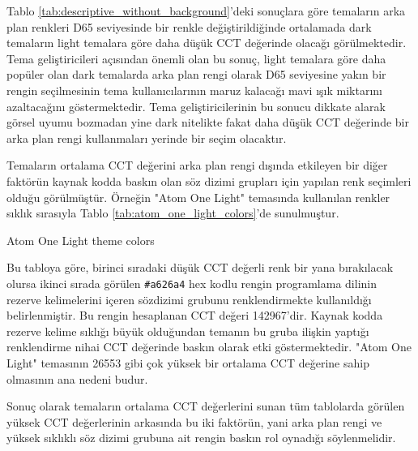 \documentclass{article}
\begin{document}
Tablo \ref{tab:descriptive_without_background}'deki sonuçlara göre temaların arka plan renkleri D65 seviyesinde bir
renkle değiştirildiğinde ortalamada dark temaların light temalara göre daha düşük CCT değerinde olacağı görülmektedir.
Tema geliştiricileri açısından önemli olan bu sonuç, light temalara göre daha popüler olan dark temalarda arka plan
rengi olarak D65 seviyesine yakın bir rengin seçilmesinin tema kullanıcılarının maruz kalacağı mavi ışık miktarını
azaltacağını göstermektedir.  Tema geliştiricilerinin bu sonucu dikkate alarak görsel uyumu bozmadan yine dark nitelikte fakat
daha düşük CCT değerinde bir arka plan rengi kullanmaları yerinde bir seçim olacaktır.

Temaların ortalama CCT değerini arka plan rengi dışında etkileyen bir diğer faktörün kaynak kodda baskın olan söz dizimi
grupları için yapılan renk seçimleri olduğu görülmüştür.  Örneğin "Atom One Light" temasında kullanılan renkler sıklık
sırasıyla Tablo \ref{tab:atom_one_light_colors}'de sunulmuştur.


\begin{table}[H]

	\caption{Atom One Light theme colors}
	\label{tab:atom_one_light_colors}
\end{table}

Bu tabloya göre, birinci sıradaki düşük CCT değerli renk bir yana bırakılacak olursa ikinci sırada görülen
\texttt{\#a626a4} hex kodlu rengin programlama dilinin rezerve kelimelerini içeren sözdizimi grubunu renklendirmekte
kullanıldığı belirlenmiştir. Bu rengin hesaplanan CCT değeri 142967'dir.  Kaynak kodda rezerve kelime sıklığı büyük
olduğundan temanın bu gruba ilişkin yaptığı renklendirme nihai CCT değerinde baskın olarak etki göstermektedir. "Atom
One Light" temasının 26553 gibi çok yüksek bir ortalama CCT değerine sahip olmasının ana nedeni budur.

Sonuç olarak temaların ortalama CCT değerlerini sunan tüm tablolarda görülen yüksek CCT değerlerinin arkasında bu iki
faktörün, yani arka plan rengi ve yüksek sıklıklı söz dizimi grubuna ait rengin baskın rol oynadığı söylenmelidir.
\end{document}
